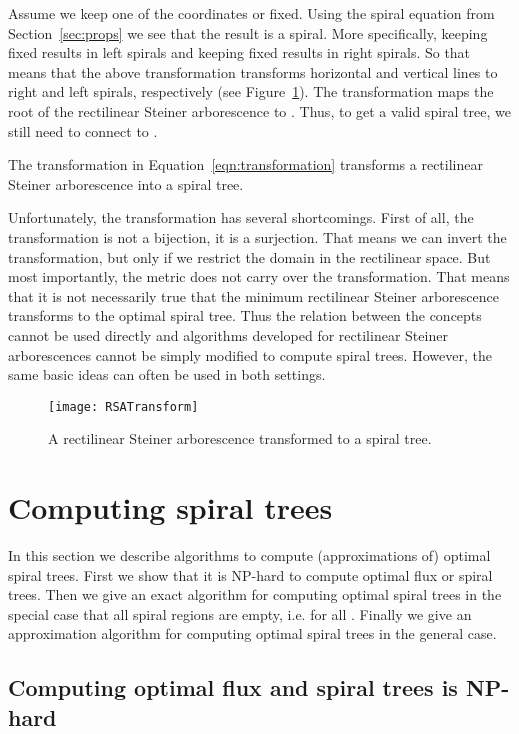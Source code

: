 \documentclass{journalA4}
\begin{document}
Assume we keep one of the coordinates  or  fixed. Using the spiral equation from Section~\ref{sec:props} we see that the result is a spiral. More specifically, keeping  fixed results in left spirals and keeping  fixed results in right spirals. So that means that the above transformation transforms horizontal and vertical lines to right and left spirals, respectively (see Figure~\ref{fig:RSATransform}). The transformation maps the root of the rectilinear Steiner arborescence to . Thus, to get a valid spiral tree, we still need to connect  to .

\begin{lemma}
The transformation in Equation~\ref{eqn:transformation} transforms a rectilinear Stei\-ner arborescence into a spiral tree.
\end{lemma}
Unfortunately, the transformation has several shortcomings. First of all, the transformation is not a bijection, it is a surjection. That means we can invert the transformation,
but only if we restrict the domain in the rectilinear space. But most importantly, the metric does not carry over the transformation. That means that it is not necessarily true
that the minimum rectilinear Steiner arborescence transforms to the optimal spiral tree. Thus the relation between the concepts cannot be used directly and algorithms developed for rectilinear Steiner arborescences cannot be simply modified to compute spiral trees. However, the same basic ideas can often be used in both settings.

\begin{figure}[t]
  \centering
  \texttt{[image: RSATransform]}
  \caption{A rectilinear Steiner arborescence transformed to a spiral tree.}
  \label{fig:RSATransform}
\end{figure}


\section{Computing spiral trees} \label{sec:computespirals}

In this section we describe algorithms to compute (approximations of) optimal spiral trees. First we show that it is NP-hard to compute optimal flux or spiral trees. Then we give an exact algorithm for computing optimal spiral trees in the special case that all spiral regions are empty, i.e.  for all . Finally we give an approximation algorithm for computing optimal spiral trees in the general case.

\subsection{Computing optimal flux and spiral trees is NP-hard}\label{sec:npproof}
\end{document}
